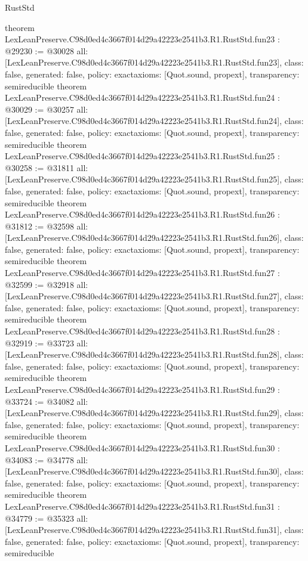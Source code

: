 \begin{lexlean}{RustStd}
\begin{coremodule}
{}
theorem LexLeanPreserve.C98d0ed4c3667f014d29a42223e2541b3.R1.RustStd.fun23 : @29230 := @30028 {
  all: [LexLeanPreserve.C98d0ed4c3667f014d29a42223e2541b3.R1.RustStd.fun23],
  class: false,
  generated: false,
  policy: exact{axioms: [Quot.sound, propext]},
  transparency: semireducible
}
theorem LexLeanPreserve.C98d0ed4c3667f014d29a42223e2541b3.R1.RustStd.fun24 : @30029 := @30257 {
  all: [LexLeanPreserve.C98d0ed4c3667f014d29a42223e2541b3.R1.RustStd.fun24],
  class: false,
  generated: false,
  policy: exact{axioms: [Quot.sound, propext]},
  transparency: semireducible
}
theorem LexLeanPreserve.C98d0ed4c3667f014d29a42223e2541b3.R1.RustStd.fun25 : @30258 := @31811 {
  all: [LexLeanPreserve.C98d0ed4c3667f014d29a42223e2541b3.R1.RustStd.fun25],
  class: false,
  generated: false,
  policy: exact{axioms: [Quot.sound, propext]},
  transparency: semireducible
}
theorem LexLeanPreserve.C98d0ed4c3667f014d29a42223e2541b3.R1.RustStd.fun26 : @31812 := @32598 {
  all: [LexLeanPreserve.C98d0ed4c3667f014d29a42223e2541b3.R1.RustStd.fun26],
  class: false,
  generated: false,
  policy: exact{axioms: [Quot.sound, propext]},
  transparency: semireducible
}
theorem LexLeanPreserve.C98d0ed4c3667f014d29a42223e2541b3.R1.RustStd.fun27 : @32599 := @32918 {
  all: [LexLeanPreserve.C98d0ed4c3667f014d29a42223e2541b3.R1.RustStd.fun27],
  class: false,
  generated: false,
  policy: exact{axioms: [Quot.sound, propext]},
  transparency: semireducible
}
theorem LexLeanPreserve.C98d0ed4c3667f014d29a42223e2541b3.R1.RustStd.fun28 : @32919 := @33723 {
  all: [LexLeanPreserve.C98d0ed4c3667f014d29a42223e2541b3.R1.RustStd.fun28],
  class: false,
  generated: false,
  policy: exact{axioms: [Quot.sound, propext]},
  transparency: semireducible
}
theorem LexLeanPreserve.C98d0ed4c3667f014d29a42223e2541b3.R1.RustStd.fun29 : @33724 := @34082 {
  all: [LexLeanPreserve.C98d0ed4c3667f014d29a42223e2541b3.R1.RustStd.fun29],
  class: false,
  generated: false,
  policy: exact{axioms: [Quot.sound, propext]},
  transparency: semireducible
}
theorem LexLeanPreserve.C98d0ed4c3667f014d29a42223e2541b3.R1.RustStd.fun30 : @34083 := @34778 {
  all: [LexLeanPreserve.C98d0ed4c3667f014d29a42223e2541b3.R1.RustStd.fun30],
  class: false,
  generated: false,
  policy: exact{axioms: [Quot.sound, propext]},
  transparency: semireducible
}
theorem LexLeanPreserve.C98d0ed4c3667f014d29a42223e2541b3.R1.RustStd.fun31 : @34779 := @35323 {
  all: [LexLeanPreserve.C98d0ed4c3667f014d29a42223e2541b3.R1.RustStd.fun31],
  class: false,
  generated: false,
  policy: exact{axioms: [Quot.sound, propext]},
  transparency: semireducible
}
\end{coremodule}
\end{lexlean}
